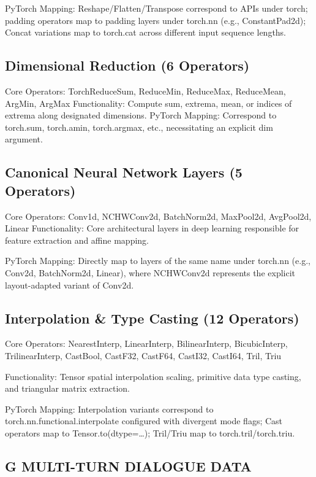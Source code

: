 \documentclass[
  10
]{article}
\begin{document}
PyTorch Mapping: Reshape/Flatten/Transpose correspond to APIs under
torch; padding operators map to padding layers under torch.nn (e.g.,
ConstantPad2d); Concat variations map to torch.cat across different
input sequence lengths.

\subsection{Dimensional Reduction (6
Operators)}\label{dimensional-reduction-6-operators}

Core Operators: TorchReduceSum, ReduceMin, ReduceMax, ReduceMean,
ArgMin, ArgMax Functionality: Compute sum, extrema, mean, or indices of
extrema along designated dimensions. PyTorch Mapping: Correspond to
torch.sum, torch.amin, torch.argmax, etc., necessitating an explicit dim
argument.

\subsection{Canonical Neural Network Layers (5
Operators)}\label{canonical-neural-network-layers-5-operators}

Core Operators: Conv1d, NCHWConv2d, BatchNorm2d, MaxPool2d, AvgPool2d,
Linear Functionality: Core architectural layers in deep learning
responsible for feature extraction and affine mapping.

PyTorch Mapping: Directly map to layers of the same name under torch.nn
(e.g., Conv2d, BatchNorm2d, Linear), where NCHWConv2d represents the
explicit layout-adapted variant of Conv2d.

\subsection{Interpolation \& Type Casting (12
Operators)}\label{interpolation-type-casting-12-operators}

Core Operators: NearestInterp, LinearInterp, BilinearInterp,
BicubicInterp, TrilinearInterp, CastBool, CastF32, CastF64, CastI32,
CastI64, Tril, Triu

Functionality: Tensor spatial interpolation scaling, primitive data type
casting, and triangular matrix extraction.

PyTorch Mapping: Interpolation variants correspond to
torch.nn.functional.interpolate configured with divergent mode flags;
Cast operators map to Tensor.to(dtype=\ldots); Tril/Triu map to
torch.tril/torch.triu.

\subsection{G MULTI-TURN DIALOGUE
DATA}\label{g-multi-turn-dialogue-data}
\end{document}
